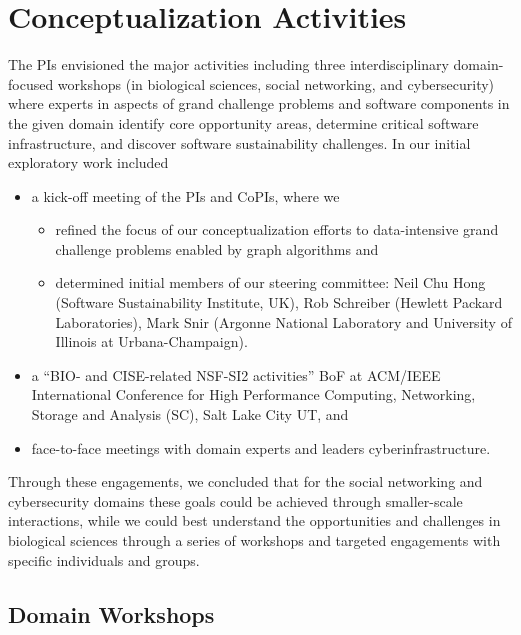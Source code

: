 \section{Conceptualization Activities} 

The PIs envisioned the major activities including three interdisciplinary domain-focused workshops (in biological sciences, social networking, and cybersecurity) where experts in aspects of grand challenge problems and software components in the given domain identify core opportunity areas, determine critical software infrastructure, and discover software sustainability challenges. In our initial exploratory work included 
\begin{itemize}
\item	a kick-off meeting of the PIs and CoPIs, where we 
	\begin{itemize}
	\item refined the focus of our conceptualization efforts to data-intensive grand challenge problems enabled by graph algorithms and
	\item determined initial members of our steering committee: Neil Chu Hong (Software Sustainability Institute, UK), Rob Schreiber (Hewlett Packard Laboratories), Mark Snir (Argonne National Laboratory and University of Illinois at Urbana-Champaign).
	\end{itemize}
\item	a ``BIO- and CISE-related NSF-SI2 activities” BoF at ACM/IEEE International Conference for High Performance Computing, Networking, Storage and Analysis (SC), Salt Lake City UT, and  
\item	face-to-face meetings with domain experts and leaders cyberinfrastructure.
\end{itemize}

Through these engagements, we concluded that for the social networking and cybersecurity domains these goals could be achieved through smaller-scale interactions, while we could best understand the opportunities and challenges in biological sciences through a series of workshops and targeted engagements with specific individuals and groups. 

\subsection{Domain Workshops}

